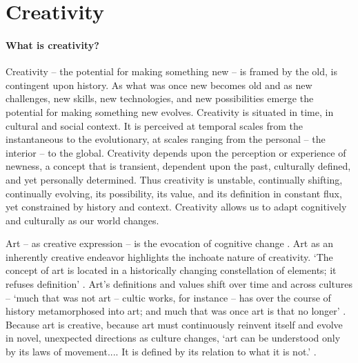 \documentclass{article}
\begin{document}

\section{Creativity}

\paragraph{What is creativity?}
Creativity -- the potential for making something new -- 
is framed by the old, 
is contingent upon history.
As what was once new becomes old and 
as new challenges, new skills, new technologies, and new possibilities emerge 
the potential for making something new evolves.
%
Creativity is situated in time, in cultural and social context. 
It is perceived at temporal scales from the instantaneous to the evolutionary,
at scales ranging from the personal -- the interior -- to the global. 
%
Creativity depends upon the perception or experience of newness, 
a concept that is transient, dependent upon the past, culturally defined, and yet personally determined.
Thus creativity is unstable, continually shifting, continually evolving, 
its possibility, its value, and its definition in constant flux, 
yet constrained by history and context.
Creativity allows us to adapt cognitively and culturally
as our world changes.


Art -- as creative expression -- is the evocation of cognitive change \citep{Donald2006}.
Art as an inherently creative endeavor
highlights the inchoate nature of creativity.
`The concept of art is located in a historically changing constellation of elements; it refuses definition'
\citep{Adorno1997}.
Art's definitions and values shift over time and across cultures -- 
`much that was not art -- cultic works, for instance -- has over the course of history metamorphosed into art; 
and much that was once art is that no longer'
\citep{Adorno1997}.
Because art is creative, 
because art must continuously reinvent itself and evolve in  novel, unexpected directions as culture changes, 
`art can be understood only by its laws of movement.... It is defined by its relation to what it is not.'
\citep{Adorno1997}.
%

\end{document}

